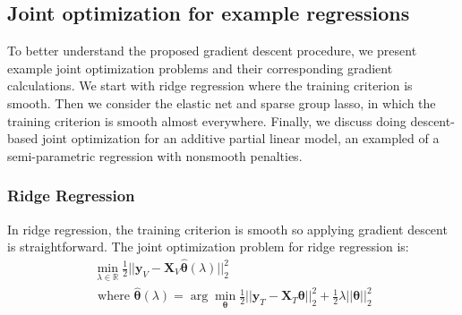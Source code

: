 \documentclass[10pt,letterpaper]{article}
\begin{document}
%

\subsection{Joint optimization for example regressions}

To better understand the proposed gradient descent procedure, we present example joint optimization problems and their corresponding gradient calculations. We start with ridge regression where the training criterion is smooth. Then we consider the elastic net and sparse group lasso, in which the training criterion is smooth almost everywhere. Finally, we discuss doing descent-based joint optimization for an additive partial linear model, an exampled of a semi-parametric regression with nonsmooth penalties.


\subsubsection{Ridge Regression}

In ridge regression, the training criterion is smooth so applying gradient descent is straightforward. The joint optimization problem for ridge regression is:
\begin{equation}
\begin{array}{c}
\min_{\lambda\in \mathbb{R}} \frac{1}{2} \lvert\lvert \boldsymbol{y}_V - \boldsymbol{X}_V \hat{\boldsymbol{\theta}} (\lambda) \rvert\rvert_2 ^2 \\
\text{  where  } \hat{\boldsymbol{\theta}} (\lambda) = \arg \min_{\boldsymbol{\theta}} \frac{1}{2} \lvert\lvert \boldsymbol{y}_T - \boldsymbol{X}_T \boldsymbol{\theta} \rvert\rvert_2 ^2 + \frac{1}{2} \lambda \lvert\lvert \boldsymbol{\theta} \rvert\rvert_2^2
\end{array}
\end{equation}
\end{document}

